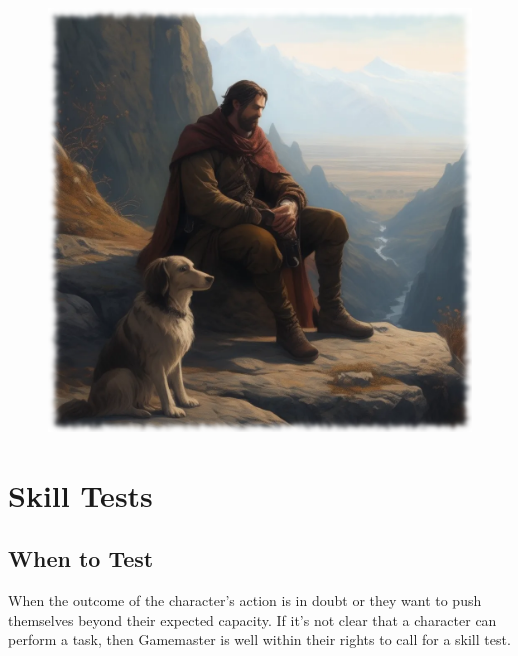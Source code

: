 
\begin{figure}
\begin{center}
\includegraphics[scale=0.23]{img/ai-images/man-with-dog.png}
\end{center}
\end{figure}


\section{Skill Tests}

\subsection{When to Test}
When the outcome of the character’s action is in doubt or they want to push themselves beyond their expected capacity. If it’s not clear that a character can perform a task, then Gamemaster is well within their rights to call for a skill test.


